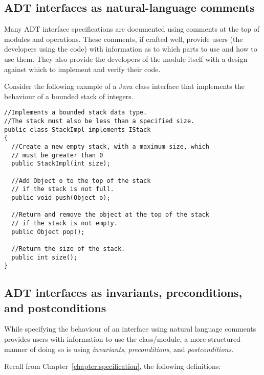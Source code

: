 \subsection{ADT interfaces as natural-language comments}

Many ADT interface specifications are documented using comments at the top of modules and operations. These comments, if crafted well, provide users (the developers using the code) with information as to which parts to use and how to use them. They also provide the developers of the module itself with a design against which to implement and verify their code.

\begin{example}
\label{ex:dbc:java-interface-comments}
Consider the following example of a Java class interface that implements the behaviour of a bounded stack of integers.

\lstset{language=Java}
\lstset{aboveskip=3mm}
\begin{lstlisting}
//Implements a bounded stack data type.
//The stack must also be less than a specified size.
public class StackImpl implements IStack
{
  //Create a new empty stack, with a maximum size, which
  // must be greater than 0
  public StackImpl(int size);

  //Add Object o to the top of the stack
  // if the stack is not full.
  public void push(Object o);

  //Return and remove the object at the top of the stack
  // if the stack is not empty.
  public Object pop();

  //Return the size of the stack.
  public int size();
}
\end{lstlisting}

\end{example}


\subsection{ADT interfaces as invariants, preconditions, and postconditions}

While specifying the behaviour of an interface using natural language comments provides users with information to use the class/module, a more structured manner of doing so is using \emph{invariants}, \emph{preconditions}, and \emph{postconditions}.

Recall from Chapter~\ref{chapter:specification}, the following definitions:

